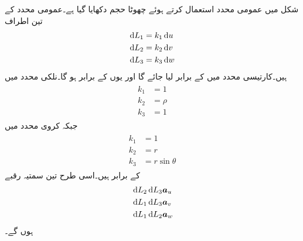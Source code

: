 شکل میں عمومی محدد استعمال کرتے ہوئے چھوٹا حجم دکھایا گیا ہے۔عمومی محدد کے تین اطراف
\begin{align*}
\dif L_1 &= k_1 \dif u \\
\dif L_2 &= k_2 \dif v \\
\dif L_3 &= k_3 \dif w 
\end{align*}
ہیں۔کارتیسی محدد میں  کے برابر لیا جائے گا اور یوں  کے برابر ہو گا۔نلکی محدد میں
\begin{gather}
\begin{aligned}\label{مساوات_گاوس_نلکی_اطراف_کے_مستقل}
k_1&=1\\
k_2&=\rho\\
k_3&=1
\end{aligned}
\end{gather}
جبکہ کروی محدد میں
\begin{gather}
\begin{aligned}\label{مساوات_گاوس_کروی_اطراف_کے_مستقل}
k_1&=1\\
k_2&=r\\
k_3&=r \sin \theta
\end{aligned}
\end{gather}
کے برابر ہیں۔اسی طرح تین سمتیہ رقبے
\begin{align*}
& \dif L_2 \dif L_3 \au\\
&\dif L_1 \dif L_3 \av\\
&\dif L_1 \dif L_2 \aw
\end{align*}
ہوں گے۔

